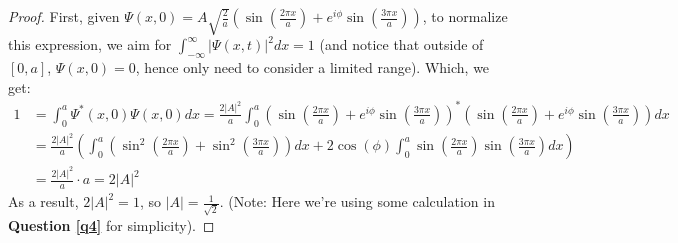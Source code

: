 \documentclass{article}
\begin{document}
\begin{proof}
    First, given $\Psi(x,0)=A\sqrt{\frac{2}{a}}(\sin(\frac{2\pi x}{a})+e^{i\phi}\sin(\frac{3\pi x}{a}))$, to normalize this expression, we aim for $\int_{-\infty}^{\infty}|\Psi(x,t)|^2dx =1$ (and notice that outside of $[0,a]$, $\Psi(x,0)=0$, hence only need to consider a limited range). Which, we get:
    \begin{align}
        1&= \int_{0}^{a}\Psi^*(x,0)\Psi(x,0)dx=\frac{2|A|^2}{a}\int_{0}^{a}\left(\sin\left(\frac{2\pi x}{a}\right)+e^{i\phi}\sin\left(\frac{3\pi x}{a}\right)\right)^*\left(\sin\left(\frac{2\pi x}{a}\right)+e^{i\phi}\sin\left(\frac{3\pi x}{a}\right)\right)dx\\
        &= \frac{2|A|^2}{a}\left(\int_{0}^{a}\left(\sin^2\left(\frac{2\pi x}{a}\right)+\sin^2\left(\frac{3\pi x}{a}\right)\right)dx+2\cos(\phi)\int_{0}^{a}\sin\left(\frac{2\pi x}{a}\right)\sin\left(\frac{3\pi x}{a}\right)dx\right)\\
        &= \frac{2|A|^2}{a}\cdot a = 2|A|^2
    \end{align}
    As a result, $2|A|^2=1$, so $|A|=\frac{1}{\sqrt{2}}$. (Note: Here we're using some calculation in \textbf{Question \ref{q4}} for simplicity).


\end{proof}
\end{document}
